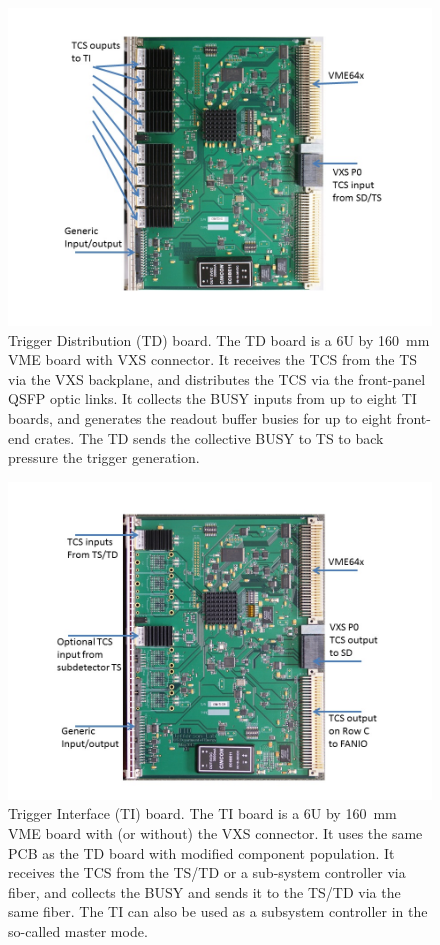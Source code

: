 \begin{figure}[hbt]
	\centering
	\includegraphics[width=1.0\columnwidth,keepaspectratio]{img/TDused.jpg}
	\caption{Trigger Distribution (TD) board.  The TD board is a 6U by 160~mm VME board with VXS connector.  It receives the TCS from the TS via the VXS backplane, and distributes the TCS via the front-panel QSFP optic links.  It collects the BUSY inputs from up to eight TI boards, and generates the readout buffer busies for up to eight front-end crates.  The TD sends the collective BUSY to TS to back pressure the trigger generation.}
	\label{fig:TDused}
\end{figure}

\begin{figure}[hbt]
	\centering
	\includegraphics[width=1.0\columnwidth,keepaspectratio]{img/TIused.jpg}
	\caption{Trigger Interface (TI) board.  The TI board is a 6U by 160~mm VME board with (or without) the VXS connector.  It uses the same PCB as the TD board with modified component population.  It receives the TCS from the TS/TD or a sub-system controller via fiber, and collects the BUSY and sends it to the TS/TD via the same fiber.  The TI can also be used as a subsystem controller in the so-called master mode.}
	\label{fig:TIused}
\end{figure}

